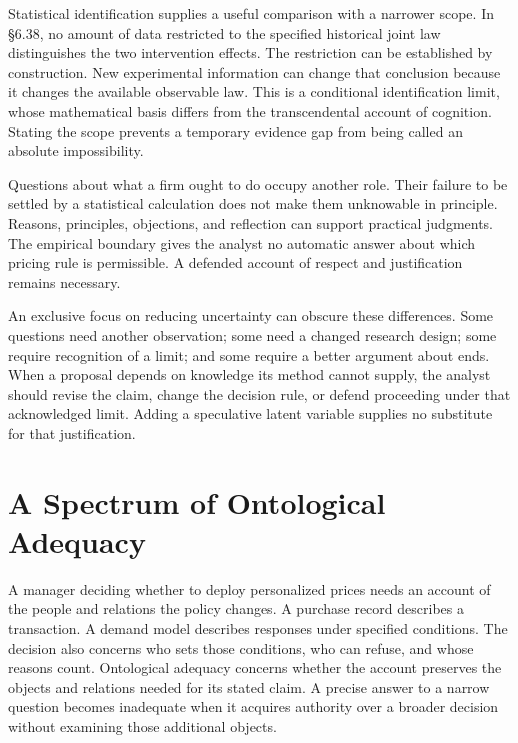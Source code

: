 Statistical identification supplies a useful comparison with a narrower
scope. In §6.38, no amount of data restricted to the specified
historical joint law distinguishes the two intervention effects. The
restriction can be established by construction. New experimental
information can change that conclusion because it changes the available
observable law. This is a conditional identification limit, whose
mathematical basis differs from the transcendental account of cognition.
Stating the scope prevents a temporary evidence gap from being called an
absolute impossibility.

Questions about what a firm ought to do occupy another role. Their
failure to be settled by a statistical calculation does not make them
unknowable in principle. Reasons, principles, objections, and reflection
can support practical judgments. The empirical boundary gives the
analyst no automatic answer about which pricing rule is permissible. A
defended account of respect and justification remains necessary.

An exclusive focus on reducing uncertainty can obscure these
differences. Some questions need another observation; some need a
changed research design; some require recognition of a limit; and some
require a better argument about ends. When a proposal depends on
knowledge its method cannot supply, the analyst should revise the claim,
change the decision rule, or defend proceeding under that acknowledged
limit. Adding a speculative latent variable supplies no substitute for
that justification.


\hypertarget{M09-a-spectrum-of-ontological-adequacy}{%
\section{A Spectrum of Ontological
Adequacy}\label{M09-a-spectrum-of-ontological-adequacy}}

\noindent \noindent A manager deciding whether to deploy personalized prices needs
an account of the people and relations the policy changes. A purchase
record describes a transaction. A demand model describes responses under
specified conditions. The decision also concerns who sets those
conditions, who can refuse, and whose reasons count. Ontological
adequacy concerns whether the account preserves the objects and
relations needed for its stated claim. A precise answer to a narrow
question becomes inadequate when it acquires authority over a broader
decision without examining those additional objects.

